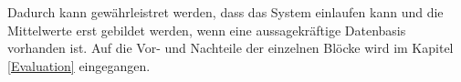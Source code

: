     Dadurch kann gewährleistret werden, dass das System einlaufen kann und die Mittelwerte erst gebildet werden, wenn eine aussagekräftige Datenbasis vorhanden ist.   
    Auf die Vor- und Nachteile der einzelnen Blöcke wird im Kapitel \ref{Evaluation} eingegangen.

